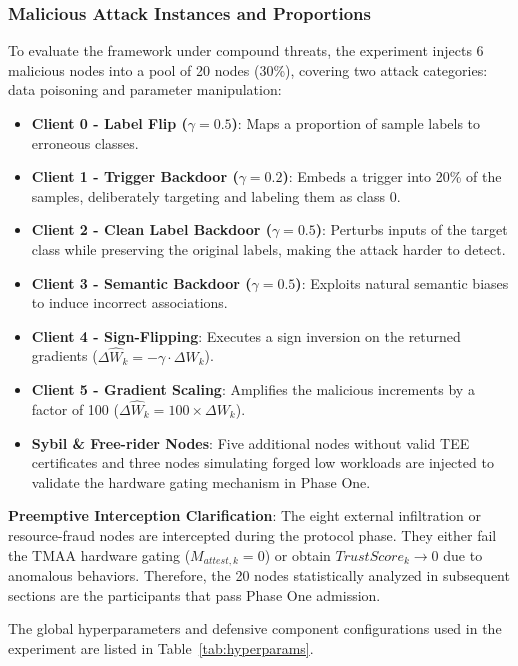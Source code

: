 \documentclass[runningheads,orivec]{llncs}
\begin{document}
\subsubsection{Malicious Attack Instances and Proportions}
To evaluate the framework under compound threats, the experiment injects 6 malicious nodes into a pool of 20 nodes (30\%), covering two attack categories: data poisoning and parameter manipulation:
\begin{itemize}
    \item \textbf{Client 0 - Label Flip ($\gamma=0.5$)}: Maps a proportion of sample labels to erroneous classes.
    \item \textbf{Client 1 - Trigger Backdoor ($\gamma=0.2$)}: Embeds a trigger into 20\% of the samples, deliberately targeting and labeling them as class $0$.
    \item \textbf{Client 2 - Clean Label Backdoor ($\gamma=0.5$)}: Perturbs inputs of the target class while preserving the original labels, making the attack harder to detect.
    \item \textbf{Client 3 - Semantic Backdoor ($\gamma=0.5$)}: Exploits natural semantic biases to induce incorrect associations.
    \item \textbf{Client 4 - Sign-Flipping}: Executes a sign inversion on the returned gradients ($\Delta \widehat{W}_k = - \gamma \cdot \Delta W_k$).
    \item \textbf{Client 5 - Gradient Scaling}: Amplifies the malicious increments by a factor of 100 ($\Delta \widehat{W}_k = 100 \times \Delta W_k$).
    \item \textbf{Sybil \& Free-rider Nodes}: Five additional nodes without valid TEE certificates and three nodes simulating forged low workloads are injected to validate the hardware gating mechanism in Phase One.
\end{itemize}

\textbf{Preemptive Interception Clarification}: The eight external infiltration or resource-fraud nodes are intercepted during the protocol phase. They either fail the TMAA hardware gating ($M_{attest,k}=0$) or obtain $TrustScore_k \to 0$ due to anomalous behaviors. Therefore, the 20 nodes statistically analyzed in subsequent sections are the participants that pass Phase One admission.

The global hyperparameters and defensive component configurations used in the experiment are listed in Table~\ref{tab:hyperparams}.
\end{document}
